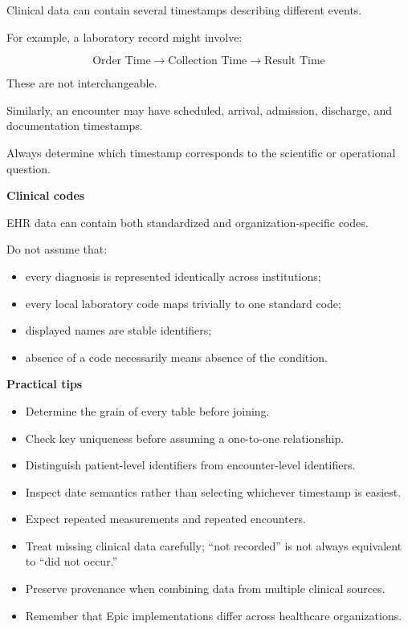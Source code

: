 \documentclass[11pt,letterpaper]{article}
\begin{document}
Clinical data can contain several timestamps describing different events.

For example, a laboratory record might involve:

\[
\text{Order Time}
\rightarrow
\text{Collection Time}
\rightarrow
\text{Result Time}
\]

These are not interchangeable.

Similarly, an encounter may have scheduled, arrival, admission, discharge,
and documentation timestamps.

Always determine which timestamp corresponds to the scientific or operational
question.

\textbf{Clinical codes}

EHR data can contain both standardized and organization-specific codes.

Do not assume that:

\begin{itemize}[leftmargin=*]
    \item every diagnosis is represented identically across institutions;
    \item every local laboratory code maps trivially to one standard code;
    \item displayed names are stable identifiers;
    \item absence of a code necessarily means absence of the condition.
\end{itemize}

\textbf{Practical tips}

\begin{itemize}[leftmargin=*]
    \item Determine the grain of every table before joining.
    \item Check key uniqueness before assuming a one-to-one relationship.
    \item Distinguish patient-level identifiers from encounter-level identifiers.
    \item Inspect date semantics rather than selecting whichever timestamp is easiest.
    \item Expect repeated measurements and repeated encounters.
    \item Treat missing clinical data carefully; ``not recorded'' is not always
    equivalent to ``did not occur.''
    \item Preserve provenance when combining data from multiple clinical sources.
    \item Remember that Epic implementations differ across healthcare organizations.
\end{itemize}
\end{document}
